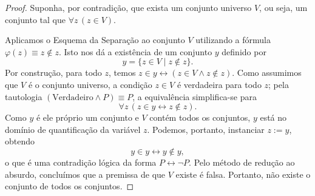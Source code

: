 \begin{proof}
Suponha, por contradição, que exista um conjunto universo $V$, ou seja, um conjunto tal que $\forall z\, (z \in V)$.

Aplicamos o Esquema da Separação ao conjunto $V$ utilizando a fórmula $\varphi(z) \equiv z \notin z$. Isto nos dá a existência de um conjunto $y$ definido por
\begin{equation*}
    y = \{z \in V \mid z \notin z\}.
\end{equation*}
Por construção, para todo $z$, temos $z \in y \leftrightarrow (z \in V \land z \notin z)$. Como assumimos que $V$ é o conjunto universo, a condição $z \in V$ é verdadeira para todo $z$; pela tautologia $(\text{Verdadeiro} \land P) \equiv P$, a equivalência simplifica-se para
\begin{equation*}
    \forall z\, (z \in y \leftrightarrow z \notin z).
\end{equation*}
Como $y$ é ele próprio um conjunto e $V$ contém todos os conjuntos, $y$ está no domínio de quantificação da variável $z$. Podemos, portanto, instanciar $z := y$, obtendo
\begin{equation*}
    y \in y \leftrightarrow y \notin y,
\end{equation*}
o que é uma contradição lógica da forma $P \leftrightarrow \neg P$. Pelo método de redução ao absurdo, concluímos que a premissa de que $V$ existe é falsa. Portanto, não existe o conjunto de todos os conjuntos.
\end{proof}

